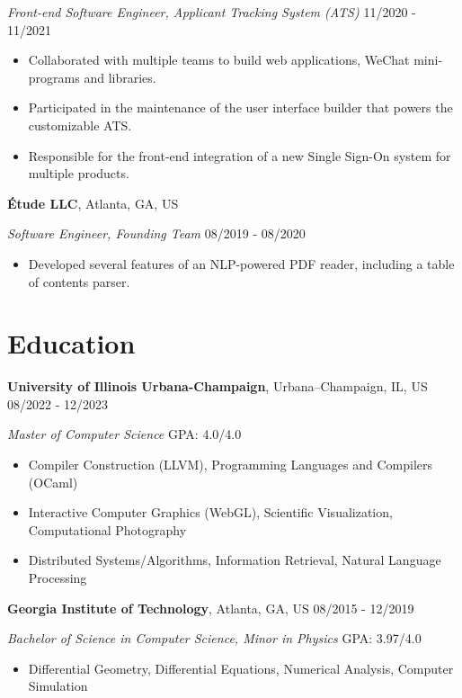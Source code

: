 \documentclass[12pt]{article}
\begin{document}
\textit{Front-end Software Engineer, Applicant Tracking System (ATS)} \hfill 11/2020 - 11/2021

\begin{itemize}
\item Collaborated with multiple teams to build web applications, WeChat mini-programs and libraries.
\item Participated in the maintenance of the user interface builder that powers the customizable ATS.
\item Responsible for the front-end integration of a new Single Sign-On system for multiple products.
\end{itemize}

\textbf{Étude LLC}, Atlanta, GA, US

\textit{Software Engineer, Founding Team} \hfill 08/2019 - 08/2020

\begin{itemize}
\item Developed several features of an NLP-powered PDF reader, including a table of contents parser.
\end{itemize}

\section*{Education}

\textbf{University of Illinois Urbana-Champaign}, Urbana–Champaign, IL, US \hfill 08/2022 - 12/2023 

\textit{Master of Computer Science}  \hfill GPA: 4.0/4.0 
{\small
\begin{itemize}
\item Compiler Construction (LLVM), Programming Languages and Compilers (OCaml)
\item Interactive Computer Graphics (WebGL), Scientific Visualization, Computational Photography
\item Distributed Systems/Algorithms, Information Retrieval, Natural Language Processing
\end{itemize}
}


\vspace{1em}
\textbf{Georgia Institute of Technology}, Atlanta, GA, US \hfill 08/2015 - 12/2019

\textit{Bachelor of Science in Computer Science, Minor in Physics} \hfill GPA: 3.97/4.0
{\small
\begin{itemize}
\item Differential Geometry, Differential Equations, Numerical Analysis, Computer Simulation
\end{itemize}
}
\end{document}
